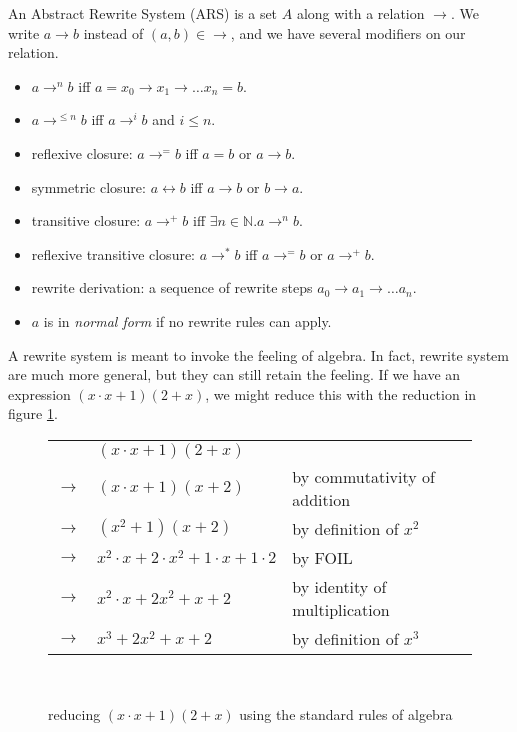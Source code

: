 \documentclass{book}
\def\N{\mathbb{N}}
\theoremstyle{definition}
\renewcommand{\leq}{\leqslant}
\begin{document}
An Abstract Rewrite System (ARS) is a set $A$ along with a relation $\to$.
We write $a \to b$ instead of $(a,b) \in \to$, and we have several modifiers on our relation.
\begin{itemize}
    \item $a \to^n b$ iff $a = x_0 \to x_1 \to \ldots x_n = b$.
    \item $a \to^{\le n} b$ iff $a \to^i b$ and $i \leq n$.
    \item reflexive closure: $a \to^= b$ iff $a = b$ or $a \to b$.
    \item symmetric closure: $a \leftrightarrow b$ iff $a \to b$ or $b \to a$.
    \item transitive closure: $a \to^+ b$ iff $\exists n\in \N. a \to^n b$.
    \item reflexive transitive closure: $a \to^* b$ iff $a \to^= b$ or $a \to^+ b$.
    \item rewrite derivation: a sequence of rewrite steps $a_0 \to a_1 \to \ldots a_n$.
    \item $a$ is in \textit{normal form} if no rewrite rules can apply.
\end{itemize}

A rewrite system is meant to invoke the feeling of algebra.
In fact, rewrite system are much more general, but they can still retain the feeling.
If we have an expression $(x\cdot x + 1)(2 + x)$, we might reduce this with the reduction in figure \ref{fig:reduce}.

\begin{figure}
\begin{tabular}{rll}
          & $(x\cdot x + 1)(2 + x)$                          & \\
    $\to$ & $(x\cdot x + 1)(x + 2)$                          & by commutativity of addition \\
    $\to$ & $(x^2 + 1)(x + 2)$                               & by definition of $x^2$\\
    $\to$ & $x^2\cdot x + 2\cdot x^2 + 1\cdot x + 1 \cdot 2$ & by FOIL\\
    $\to$ & $x^2\cdot x + 2x^2 + x + 2$                      & by identity of multiplication\\ 
    $\to$ & $x^3 + 2x^2 + x + 2$                             & by definition of $x^3$\\
\end{tabular}\\
    \caption{reducing $(x\cdot x + 1)(2 + x)$ using the standard rules of algebra}
    \label{fig:reduce}
\end{figure}
\end{document}
